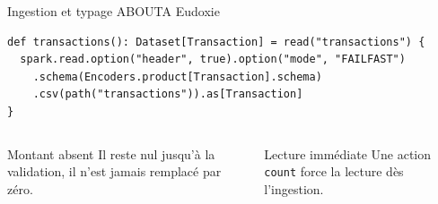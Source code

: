 \documentclass[aspectratio=169,11pt]{beamer}
\newcommand{\legende}[1]{{\color{gris}\footnotesize #1}}
\begin{document}
\begin{frame}[fragile]{Ingestion et typage}
  \legende{ABOUTA Eudoxie}

  \vspace{2mm}
\begin{lstlisting}
def transactions(): Dataset[Transaction] = read("transactions") {
  spark.read.option("header", true).option("mode", "FAILFAST")
    .schema(Encoders.product[Transaction].schema)
    .csv(path("transactions")).as[Transaction]
}
\end{lstlisting}

  \vspace{3mm}
  \begin{columns}[t,onlytextwidth]
      \begin{block}{Montant absent}
        \footnotesize Il reste nul jusqu'à la validation, il n'est jamais
        remplacé par zéro.
      \end{block}
      \begin{block}{Lecture immédiate}
        \footnotesize Une action \texttt{count} force la lecture dès
        l'ingestion.
      \end{block}
  \end{columns}

\end{frame}
\end{document}
